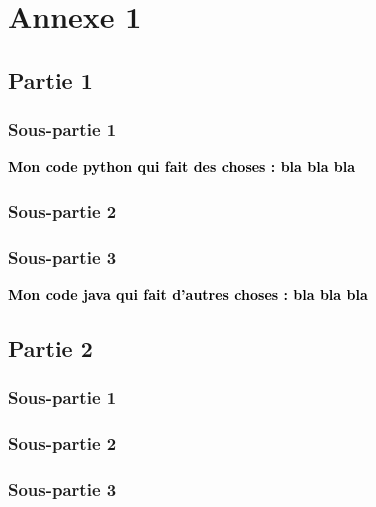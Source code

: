 \appendix

\section*{Annexe 1}
\label{sec:annexe1}

\subsection*{Partie 1}
\label{ssec:annexe1_partie1}
\subsubsection*{Sous-partie 1}
\label{sssec:annexe1_partie1_sous1}
\begin{center}
    \textcolor{black}{\textbf{Mon code python qui fait des choses : bla bla bla}}
\end{center}

\subsubsection*{Sous-partie 2}
\label{sssec:annexe1_partie1_sous2}
\subsubsection*{Sous-partie 3}
\label{sssec:annexe1_partie1_sous3}
\begin{center}
    \textcolor{black}{\textbf{Mon code java qui fait d'autres choses : bla bla bla}}
\end{center}



\subsection*{Partie 2}
\label{ssec:annexe1_partie2}
\subsubsection*{Sous-partie 1}
\label{sssec:annexe1_partie2_sous1}
\subsubsection*{Sous-partie 2}
\label{sssec:annexe1_partie2_sous2}
\subsubsection*{Sous-partie 3}
\label{sssec:annexe1_partie2_sous3}

